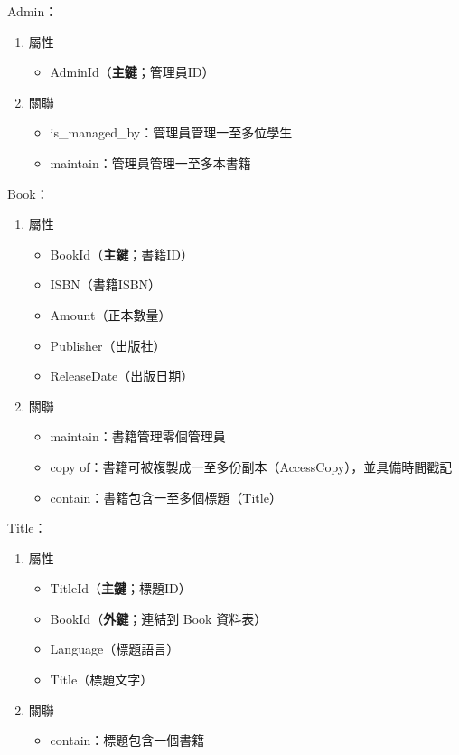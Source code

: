 \hspace*{-2em}Admin：

\begin{enumerate}
\item 屬性
    \begin{itemize}
    \item AdminId（\textbf{主鍵}；管理員ID）
    \end{itemize}
\item 關聯
    \begin{itemize}
    \item is\_managed\_by：管理員管理一至多位學生
    \item maintain：管理員管理一至多本書籍
    \end{itemize}
\end{enumerate}

\hspace*{-2em}Book：

\begin{enumerate}
\item 屬性
    \begin{itemize}
    \item BookId（\textbf{主鍵}；書籍ID）
    \item ISBN（書籍ISBN）
    \item Amount（正本數量）
    \item Publisher（出版社）
    \item ReleaseDate（出版日期）
    \end{itemize}
\item 關聯
    \begin{itemize}
    \item maintain：書籍管理零個管理員
    \item copy of：書籍可被複製成一至多份副本（AccessCopy），並具備時間戳記
    \item contain：書籍包含一至多個標題（Title）
    \end{itemize}
\end{enumerate}

\hspace*{-2em}Title：

\begin{enumerate}
\item 屬性
    \begin{itemize}
    \item TitleId（\textbf{主鍵}；標題ID）
    \item BookId（\textbf{外鍵}；連結到 Book 資料表）
    \item Language（標題語言）
    \item Title（標題文字）
    \end{itemize}
\item 關聯
    \begin{itemize}
    \item contain：標題包含一個書籍
    \end{itemize}
\end{enumerate}

